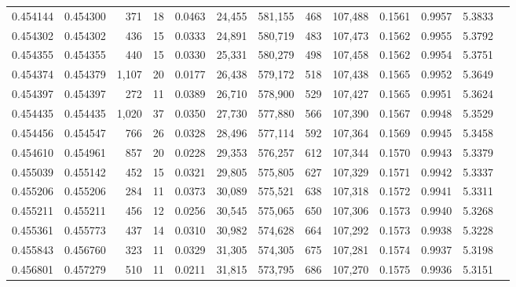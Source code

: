 \begin{tabular}{rrrrrrrrrrrrr}
0.454144 & 0.454300 &   371 &    18 &                                     0.0463 &  24,455 & 581,155 &     468 & 107,488 & 0.1561 & 0.9957 & 5.3833 \\
0.454302 & 0.454302 &   436 &    15 &                                     0.0333 &  24,891 & 580,719 &     483 & 107,473 & 0.1562 & 0.9955 & 5.3792 \\
0.454355 & 0.454355 &   440 &    15 &                                     0.0330 &  25,331 & 580,279 &     498 & 107,458 & 0.1562 & 0.9954 & 5.3751 \\
0.454374 & 0.454379 & 1,107 &    20 &                                     0.0177 &  26,438 & 579,172 &     518 & 107,438 & 0.1565 & 0.9952 & 5.3649 \\
0.454397 & 0.454397 &   272 &    11 &                                     0.0389 &  26,710 & 578,900 &     529 & 107,427 & 0.1565 & 0.9951 & 5.3624 \\
0.454435 & 0.454435 & 1,020 &    37 &                                     0.0350 &  27,730 & 577,880 &     566 & 107,390 & 0.1567 & 0.9948 & 5.3529 \\
0.454456 & 0.454547 &   766 &    26 &                                     0.0328 &  28,496 & 577,114 &     592 & 107,364 & 0.1569 & 0.9945 & 5.3458 \\
0.454610 & 0.454961 &   857 &    20 &                                     0.0228 &  29,353 & 576,257 &     612 & 107,344 & 0.1570 & 0.9943 & 5.3379 \\
0.455039 & 0.455142 &   452 &    15 &                                     0.0321 &  29,805 & 575,805 &     627 & 107,329 & 0.1571 & 0.9942 & 5.3337 \\
0.455206 & 0.455206 &   284 &    11 &                                     0.0373 &  30,089 & 575,521 &     638 & 107,318 & 0.1572 & 0.9941 & 5.3311 \\
0.455211 & 0.455211 &   456 &    12 &                                     0.0256 &  30,545 & 575,065 &     650 & 107,306 & 0.1573 & 0.9940 & 5.3268 \\
0.455361 & 0.455773 &   437 &    14 &                                     0.0310 &  30,982 & 574,628 &     664 & 107,292 & 0.1573 & 0.9938 & 5.3228 \\
0.455843 & 0.456760 &   323 &    11 &                                     0.0329 &  31,305 & 574,305 &     675 & 107,281 & 0.1574 & 0.9937 & 5.3198 \\
0.456801 & 0.457279 &   510 &    11 &                                     0.0211 &  31,815 & 573,795 &     686 & 107,270 & 0.1575 & 0.9936 & 5.3151 \\

\end{tabular}
